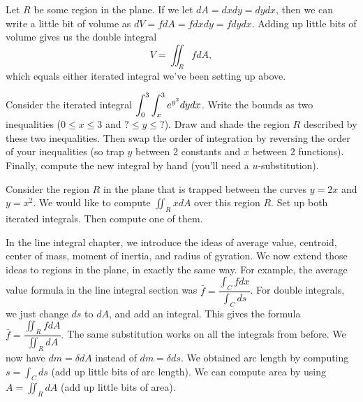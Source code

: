 

Let $R$ be some region in the plane.  If we let $dA=dxdy=dydx$, then we can write a little bit of volume as $dV=fdA=fdxdy=fdydx.$ Adding up little bits of volume gives us the double integral 
$$V = \iint_R fdA,$$
which equals either iterated integral we've been setting up above. 


\begin{problem}
Consider the iterated integral $\displaystyle \int_0^3\int_x^3 e^{y^2}dydx$. Write the bounds as two inequalities ($0\leq x\leq 3$ and $?\leq y\leq ?$). Draw and shade the region $R$ described by these two inequalities.  Then swap the order of integration by reversing the order of your inequalities (so trap $y$ between 2 constants and $x$ between 2 functions). Finally, compute the new integral by hand (you'll need a $u$-substitution).
\end{problem}


\begin{problem}
Consider the region $R$ in the plane that is trapped between the curves $y=2x$ and $y=x^2$.  We would like to compute $\iint_R x dA$ over this region $R$.  Set up both iterated integrals. Then compute one of them.
\end{problem}

In the line integral chapter, we introduce the ideas of average value, centroid, center of mass, moment of inertia, and radius of gyration.  We now extend those ideas to regions in the plane, in exactly the same way.  For example, the average value formula in the line integral section was $\bar f = \dfrac{\int_C fdx}{\int_C ds}$. For double integrals, we just change $ds$ to $dA$, and add an integral.  This gives the formula $\bar f = \dfrac{\iint_R fdA}{\iint_R dA}.$ The same substitution works on all the integrals from before.  We now have $dm = \delta dA$ instead of $dm=\delta ds$. We obtained arc length by computing $s=\int_C ds$ (add up little bits of arc length).  We can compute area by using $A=\iint_R dA$ (add up little bits of area). 

